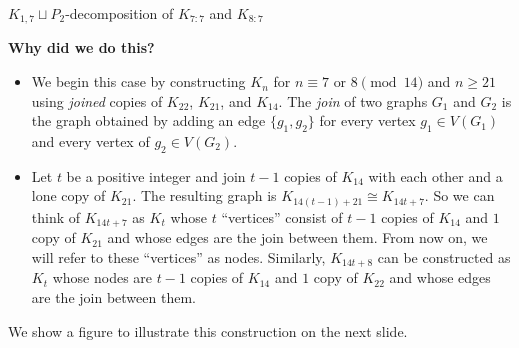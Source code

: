 \documentclass[xcolor=x11names,compress,8pt]{beamer}
\theoremstyle{plain}
\begin{document}
\begin{frame}{$K_{1,7}\sqcup P_{2}$-decomposition of $K_{7:7}$ and $K_{8:7}$}

\textbf{Why did we do this?}\newline

\begin{itemize}

    \item We begin this case by constructing $K_{n}$ for $n \equiv 7 \textrm{ or } 8 \pmod{14}$ and $n\geq 21$ using \textit{joined} copies of $K_{22}$, $K_{21}$, and $K_{14}$. The \textit{join} of two graphs $G_{1}$ and $G_{2}$ is the graph obtained by adding an edge $\{g_1,g_2\}$ for every vertex $g_1 \in V(G_{1})$ and every vertex of $g_2 \in V(G_{2})$.

    \item Let $t$ be a positive integer and join $t-1$ copies of $K_{14}$ with each other and a lone copy of $K_{21}$. The resulting graph is $K_{14(t-1)+21} \cong K_{14t+7}$. So we can think of $K_{14t+7}$ as $K_{t}$ whose $t$ ``vertices'' consist of $t-1$ copies of $K_{14}$ and $1$ copy of $K_{21}$ and whose edges are the join between them. From now on, we will refer to these ``vertices'' as nodes. Similarly, $K_{14t+8}$ can be constructed as $K_{t}$ whose nodes are $t-1$ copies of $K_{14}$ and $1$ copy of $K_{22}$ and whose edges are the join between them.

\end{itemize}

We show a figure to illustrate this construction on the next slide.

\end{frame}
\end{document}
